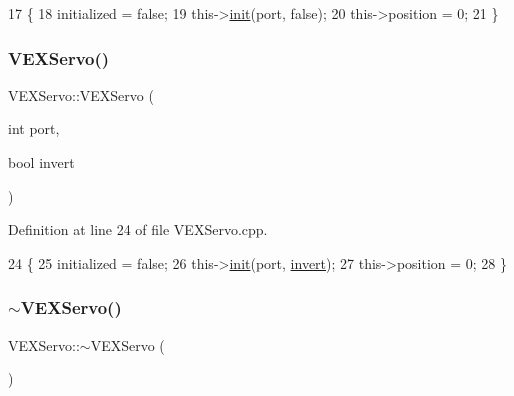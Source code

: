 \begin{DoxyCode}
17                            \{
18     initialized = \textcolor{keyword}{false};
19     this->\hyperlink{class_v_e_x_servo_aebc9e0de41cfb129168f5687a92c618e}{init}(port, \textcolor{keyword}{false});
20     this->position = 0;
21 \}
\end{DoxyCode}
\mbox{\label{class_v_e_x_servo_a50cbd7885996e04d3c77b61b76d2ed91}} 
\subsubsection{\texorpdfstring{V\+E\+X\+Servo()}{VEXServo()}\hspace{0.1cm}{\footnotesize\ttfamily [3/3]}}
{\footnotesize\ttfamily V\+E\+X\+Servo\+::\+V\+E\+X\+Servo (\begin{DoxyParamCaption}\item[{int}]{port,  }\item[{bool}]{invert }\end{DoxyParamCaption})}



Definition at line 24 of file V\+E\+X\+Servo.\+cpp.


\begin{DoxyCode}
24                                         \{
25     initialized = \textcolor{keyword}{false};
26     this->\hyperlink{class_v_e_x_servo_aebc9e0de41cfb129168f5687a92c618e}{init}(port, \hyperlink{class_v_e_x_servo_a9bd31afec53e4c45d264c2480b0c0e5e}{invert});
27     this->position = 0;
28 \}
\end{DoxyCode}
\mbox{\label{class_v_e_x_servo_a9a25c4d4400daadf45b19b1fa47710ab}} 
\subsubsection{\texorpdfstring{$\sim$\+V\+E\+X\+Servo()}{~VEXServo()}}
{\footnotesize\ttfamily V\+E\+X\+Servo\+::$\sim$\+V\+E\+X\+Servo (\begin{DoxyParamCaption}{ }\end{DoxyParamCaption})}



